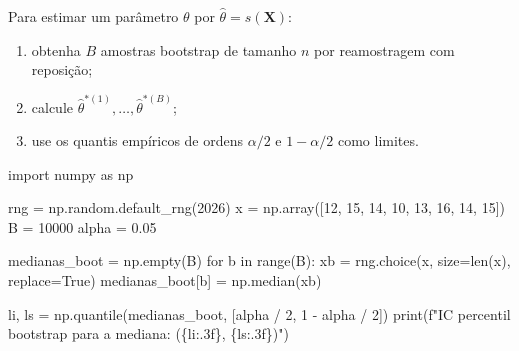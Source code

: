 \documentclass[
  letterpaper,
  DIV=11,
  numbers=noendperiod]{scrreprt}
\newenvironment{Shaded}{\begin{snugshade}}{\end{snugshade}}
\newcommand{\BuiltInTok}[1]{\textcolor[rgb]{0.00,0.23,0.31}{#1}}
\newcommand{\ControlFlowTok}[1]{\textcolor[rgb]{0.00,0.23,0.31}{#1}}
\newcommand{\DecValTok}[1]{\textcolor[rgb]{0.68,0.00,0.00}{#1}}
\newcommand{\FloatTok}[1]{\textcolor[rgb]{0.68,0.00,0.00}{#1}}
\newcommand{\ImportTok}[1]{\textcolor[rgb]{0.00,0.46,0.62}{#1}}
\newcommand{\KeywordTok}[1]{\textcolor[rgb]{0.00,0.23,0.31}{#1}}
\newcommand{\NormalTok}[1]{\textcolor[rgb]{0.00,0.23,0.31}{#1}}
\newcommand{\OperatorTok}[1]{\textcolor[rgb]{0.37,0.37,0.37}{#1}}
\newcommand{\SpecialCharTok}[1]{\textcolor[rgb]{0.37,0.37,0.37}{#1}}
\newcommand{\SpecialStringTok}[1]{\textcolor[rgb]{0.13,0.47,0.30}{#1}}
\newcommand{\VariableTok}[1]{\textcolor[rgb]{0.07,0.07,0.07}{#1}}
\providecommand{\tightlist}{%
  \setlength{\itemsep}{0pt}\setlength{\parskip}{0pt}}\usepackage{longtable,booktabs,array}
\begin{document}
\begin{tcolorbox}[enhanced jigsaw, colback=white, leftrule=.75mm, colbacktitle=quarto-callout-note-color!10!white, breakable, titlerule=0mm, bottomtitle=1mm, title=\textcolor{quarto-callout-note-color}{\faInfo}\hspace{0.5em}{Algoritmo --- intervalo percentil bootstrap}, colframe=quarto-callout-note-color-frame, toprule=.15mm, opacityback=0, bottomrule=.15mm, opacitybacktitle=0.6, arc=.35mm, toptitle=1mm, rightrule=.15mm, coltitle=black, left=2mm]

Para estimar um parâmetro \(\theta\) por
\(\widehat\theta=s(\mathbf{X})\):

\begin{enumerate}
\def\labelenumi{\arabic{enumi}.}
\tightlist
\item
  obtenha \(B\) amostras bootstrap de tamanho \(n\) por reamostragem com
  reposição;
\item
  calcule \(\widehat\theta^{*(1)},\ldots,\widehat\theta^{*(B)}\);
\item
  use os quantis empíricos de ordens \(\alpha/2\) e \(1-\alpha/2\) como
  limites.
\end{enumerate}

\end{tcolorbox}

\begin{Shaded}
\begin{Highlighting}[]
\ImportTok{import}\NormalTok{ numpy }\ImportTok{as}\NormalTok{ np}

\NormalTok{rng }\OperatorTok{=}\NormalTok{ np.random.default\_rng(}\DecValTok{2026}\NormalTok{)}
\NormalTok{x }\OperatorTok{=}\NormalTok{ np.array([}\DecValTok{12}\NormalTok{, }\DecValTok{15}\NormalTok{, }\DecValTok{14}\NormalTok{, }\DecValTok{10}\NormalTok{, }\DecValTok{13}\NormalTok{, }\DecValTok{16}\NormalTok{, }\DecValTok{14}\NormalTok{, }\DecValTok{15}\NormalTok{])}
\NormalTok{B }\OperatorTok{=} \DecValTok{10000}
\NormalTok{alpha }\OperatorTok{=} \FloatTok{0.05}

\NormalTok{medianas\_boot }\OperatorTok{=}\NormalTok{ np.empty(B)}
\ControlFlowTok{for}\NormalTok{ b }\KeywordTok{in} \BuiltInTok{range}\NormalTok{(B):}
\NormalTok{    xb }\OperatorTok{=}\NormalTok{ rng.choice(x, size}\OperatorTok{=}\BuiltInTok{len}\NormalTok{(x), replace}\OperatorTok{=}\VariableTok{True}\NormalTok{)}
\NormalTok{    medianas\_boot[b] }\OperatorTok{=}\NormalTok{ np.median(xb)}

\NormalTok{li, ls }\OperatorTok{=}\NormalTok{ np.quantile(medianas\_boot, [alpha }\OperatorTok{/} \DecValTok{2}\NormalTok{, }\DecValTok{1} \OperatorTok{{-}}\NormalTok{ alpha }\OperatorTok{/} \DecValTok{2}\NormalTok{])}
\BuiltInTok{print}\NormalTok{(}\SpecialStringTok{f"IC percentil bootstrap para a mediana: (}\SpecialCharTok{\{}\NormalTok{li}\SpecialCharTok{:.3f\}}\SpecialStringTok{, }\SpecialCharTok{\{}\NormalTok{ls}\SpecialCharTok{:.3f\}}\SpecialStringTok{)"}\NormalTok{)}
\end{Highlighting}
\end{Shaded}
\end{document}
